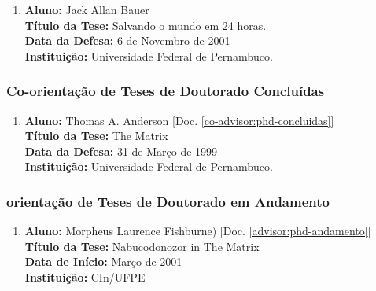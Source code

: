 \documentclass[a4paper,oneside,12pt]{article}
\begin{document}
\begin{enumerate}
\renewcommand{\labelenumi}{{\large\bfseries\arabic{enumi}.}}

\item       \textbf{Aluno:} Jack Allan Bauer \mbox{} \\
            \textbf{Título da Tese:} Salvando o mundo em 24 horas.\\
            \textbf{Data da Defesa:} 6 de Novembro de 2001 \\
            \textbf{Instituição:} Universidade Federal de Pernambuco.

\end{enumerate}


\subsubsection{Co-orientação de Teses de Doutorado Concluídas}
\vspace{0.3cm}

\begin{enumerate}
\renewcommand{\labelenumi}{{\large\bfseries\arabic{enumi}.}}

\item       \textbf{Aluno:} Thomas A. Anderson [Doc. \ref{co-advisor:phd-concluidas}]\\
            \textbf{Título da Tese:} The Matrix \\
            \textbf{Data da Defesa:} 31 de Março de 1999 \\
            \textbf{Instituição:} Universidade Federal de Pernambuco.

\end{enumerate}


\subsubsection{orientação de Teses de Doutorado em Andamento}
\vspace{0.3cm}

\begin{enumerate}
\renewcommand{\labelenumi}{{\large\bfseries\arabic{enumi}.}}

\item       \textbf{Aluno:} Morpheus Laurence Fishburne) [Doc. \ref{advisor:phd-andamento}] \\
            \textbf{Título da Tese:} Nabucodonozor in The Matrix \\
            \textbf{Data de Início:} Março de 2001 \\
            \textbf{Instituição:} CIn/UFPE

\end{enumerate}
\end{document}
